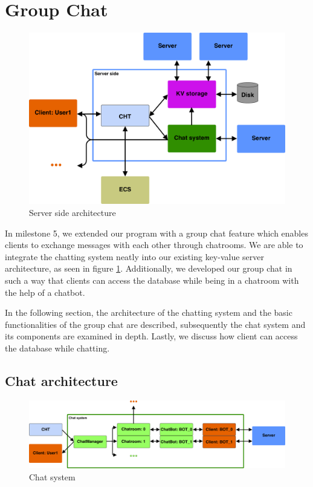 \section{Group Chat}
\label{sec:groupchat}

\begin{figure}[h]
	\centering
	\includegraphics[width=\linewidth]{figures/chat/chat_full_arch.png}
	\caption{Server side architecture}
	\label{fig:chat_arch}
\end{figure}

In milestone 5, we extended our program with a group chat feature which enables clients to exchange messages with each other through chatrooms. We are able to integrate the chatting system neatly into our existing key-value server architecture, as seen in figure \ref{fig:chat_arch}. Additionally, we developed our group chat in such a way that clients can access the database while being in a chatroom with the help of a chatbot.
 
In the following section, the architecture of the chatting system and the basic functionalities of the group chat are described, subsequently the chat system and its components are examined in depth. Lastly, we discuss how client can access the database while chatting.

\subsection{Chat architecture}

\begin{figure}[h]
	\centering
	\includegraphics[width=\linewidth]{figures/chat/chat_arch.png}
	\caption{Chat system}
	\label{fig:chat_inside}
\end{figure}

